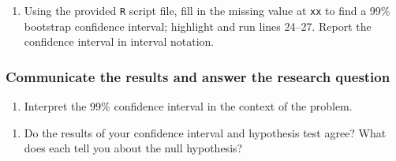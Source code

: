 \documentclass[
]{report}
\newenvironment{Shaded}{\begin{snugshade}}{\end{snugshade}}
\newcommand{\AttributeTok}[1]{\textcolor[rgb]{0.77,0.63,0.00}{#1}}
\newcommand{\CommentTok}[1]{\textcolor[rgb]{0.56,0.35,0.01}{\textit{#1}}}
\newcommand{\DecValTok}[1]{\textcolor[rgb]{0.00,0.00,0.81}{#1}}
\newcommand{\FunctionTok}[1]{\textcolor[rgb]{0.00,0.00,0.00}{#1}}
\newcommand{\NormalTok}[1]{#1}
\newcommand{\SpecialCharTok}[1]{\textcolor[rgb]{0.00,0.00,0.00}{#1}}
\providecommand{\tightlist}{%
  \setlength{\itemsep}{0pt}\setlength{\parskip}{0pt}}
\begin{document}
\begin{enumerate}
\def\labelenumi{\arabic{enumi}.}
\setcounter{enumi}{20}
\tightlist
\item
  Using the provided \texttt{R} script file, fill in the missing value at \texttt{xx} to find a 99\% bootstrap confidence interval; highlight and run lines 24--27. Report the confidence interval in interval notation.
\end{enumerate}

\begin{Shaded}
\end{Shaded}

\vspace{.5in}

\hypertarget{communicate-the-results-and-answer-the-research-question-2}{%
\subsubsection*{Communicate the results and answer the research question}\label{communicate-the-results-and-answer-the-research-question-2}}

\begin{enumerate}
\def\labelenumi{\arabic{enumi}.}
\setcounter{enumi}{21}
\tightlist
\item
  Interpret the 99\% confidence interval in the context of the problem.
\end{enumerate}

\vspace{1in}

\begin{enumerate}
\def\labelenumi{\arabic{enumi}.}
\setcounter{enumi}{22}
\tightlist
\item
  Do the results of your confidence interval and hypothesis test agree? What does each tell you about the null hypothesis?
\end{enumerate}
\end{document}

